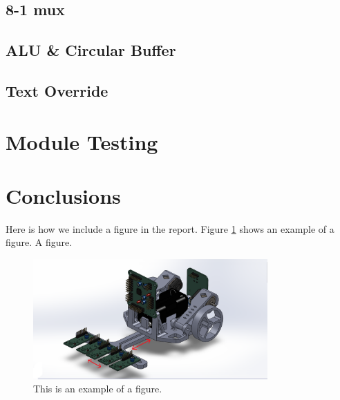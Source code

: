 \documentclass[12pt]{article}
\begin{document}
\subsection{8-1 mux}


\subsection{ALU \& Circular Buffer}


\subsection{Text Override}



\newpage

\section{Module Testing}

\newpage

\section{Conclusions}


\newpage


\printbibliography

\newpage
\appendix

Here is how we include a figure in the report. Figure \ref{fig:example} shows an example of a figure. A figure.

\begin{figure}[H]
  \centering
  \includegraphics[width=0.8\textwidth]{example.png}
  \caption{This is an example of a figure.}
  \label{fig:example}
\end{figure}
\end{document}
